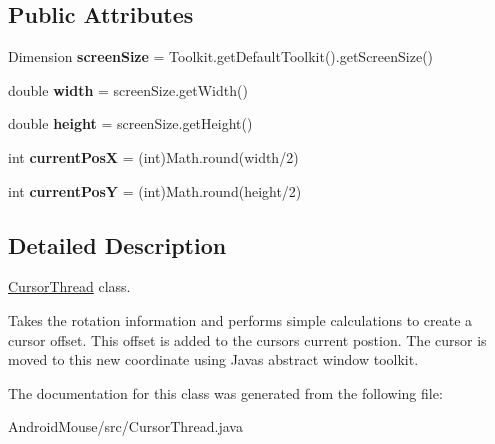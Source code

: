 \subsection*{Public Attributes}
\begin{DoxyCompactItemize}
\item 
Dimension {\bfseries screen\+Size} = Toolkit.\+get\+Default\+Toolkit().get\+Screen\+Size()\hypertarget{class_cursor_thread_aa502eaff9091012ae0e8eb5ec85fa551}{}\label{class_cursor_thread_aa502eaff9091012ae0e8eb5ec85fa551}

\item 
double {\bfseries width} = screen\+Size.\+get\+Width()\hypertarget{class_cursor_thread_a44f7c6590e5893a54824cf3d3a4e2bcb}{}\label{class_cursor_thread_a44f7c6590e5893a54824cf3d3a4e2bcb}

\item 
double {\bfseries height} = screen\+Size.\+get\+Height()\hypertarget{class_cursor_thread_af3bfed280e640ba1a55b49a0d3f48755}{}\label{class_cursor_thread_af3bfed280e640ba1a55b49a0d3f48755}

\item 
int {\bfseries current\+PosX} = (int)Math.\+round(width/2)\hypertarget{class_cursor_thread_a4f68655ab65b581c5194f75f2510c866}{}\label{class_cursor_thread_a4f68655ab65b581c5194f75f2510c866}

\item 
int {\bfseries current\+PosY} = (int)Math.\+round(height/2)\hypertarget{class_cursor_thread_a3e1987c0d9d200e1022e1ca4885e3cfb}{}\label{class_cursor_thread_a3e1987c0d9d200e1022e1ca4885e3cfb}

\end{DoxyCompactItemize}


\subsection{Detailed Description}
\hyperlink{class_cursor_thread}{Cursor\+Thread} class. 

Takes the rotation information and performs simple calculations to create a cursor offset. This offset is added to the cursor\textquotesingle{}s current postion. The cursor is moved to this new coordinate using Java\textquotesingle{}s abstract window toolkit. 

The documentation for this class was generated from the following file\+:\begin{DoxyCompactItemize}
\item 
Android\+Mouse/src/Cursor\+Thread.\+java\end{DoxyCompactItemize}
